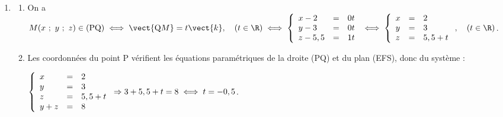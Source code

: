 \begin{enumerate}
\begin{enumerate}
$M(x~;~y~;~z) \in (\text{EFS}) \iff 0x + 1y + 1z = d, \quad d \in \R$.

Or, par exemple E(0~;~4~;~4) $\in (\text{EFS}) \iff 0 + 4 + 4 = d \iff d = 8$.

On a donc $M(x~;~y~;~z) \in (\text{EFS}) \iff y + z = 8.$
	\end{enumerate}	
\item %

	\begin{enumerate}
		\item %

On a $M(x~;~y~;~z) \in (\text{PQ}) \iff \vect{\text{Q}M} = t\vect{k}, \quad (t \in \R) \iff \left\{\begin{array}{l c l}
x - 2 &=& 0t\\
y - 3&=&0t\\
z - 5,5&=&1t
\end{array}\right.\iff \left\{\begin{array}{l c l}
x &=& 2\\
y &=&3\\
z &=&5,5 + t
\end{array}\right., \quad (t \in \R)$.
		\item %
Les coordonnées du point P vérifient les équations paramétriques de la droite (PQ) et du plan (EFS), donc du système :

$\left\{\begin{array}{l c l}
x &=&2\\
y &=&3\\
z &=&5,5 + t\\
y + z &=& 8
\end{array}\right. \Rightarrow 3 + 5,5 + t  = 8 \iff t = - 0,5$.


\end{enumerate}
\end{enumerate}
